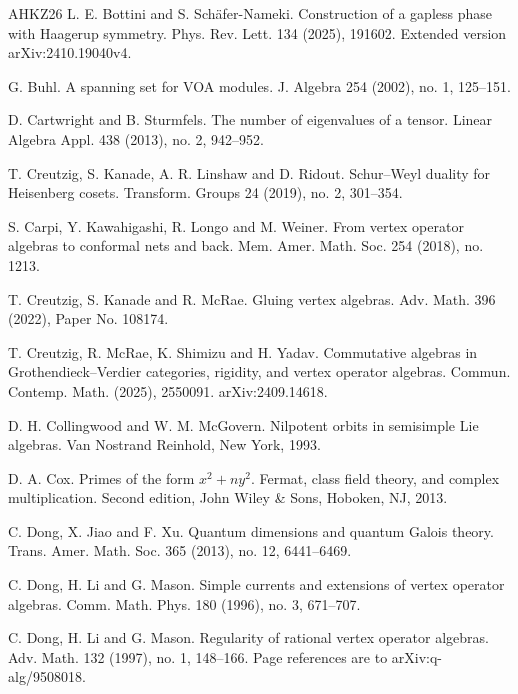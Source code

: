 \documentclass[leqno]{article}
\numberwithin{equation}{section}
\begin{document}
\begin{thebibliography}{AHKZ26}
L. E. Bottini and S. Schäfer-Nameki.
\newblock Construction of a gapless phase with Haagerup symmetry.
\newblock Phys. Rev. Lett. 134 (2025), 191602. Extended version arXiv:2410.19040v4.

G. Buhl.
\newblock A spanning set for VOA modules.
\newblock J. Algebra 254 (2002), no. 1, 125--151.

D. Cartwright and B. Sturmfels.
\newblock The number of eigenvalues of a tensor.
\newblock Linear Algebra Appl. 438 (2013), no. 2, 942--952.

T. Creutzig, S. Kanade, A. R. Linshaw and D. Ridout.
\newblock Schur--Weyl duality for Heisenberg cosets.
\newblock Transform. Groups 24 (2019), no. 2, 301--354.

S. Carpi, Y. Kawahigashi, R. Longo and M. Weiner.
\newblock From vertex operator algebras to conformal nets and back.
\newblock Mem. Amer. Math. Soc. 254 (2018), no. 1213.

T. Creutzig, S. Kanade and R. McRae.
\newblock Gluing vertex algebras.
\newblock Adv. Math. 396 (2022), Paper No. 108174.

T. Creutzig, R. McRae, K. Shimizu and H. Yadav.
\newblock Commutative algebras in Grothendieck--Verdier categories, rigidity, and vertex operator algebras.
\newblock Commun. Contemp. Math. (2025), 2550091. arXiv:2409.14618.

D. H. Collingwood and W. M. McGovern.
\newblock Nilpotent orbits in semisimple Lie algebras.
\newblock Van Nostrand Reinhold, New York, 1993.

D. A. Cox.
\newblock Primes of the form $x^2+ny^2$. Fermat, class field theory, and complex multiplication.
\newblock Second edition, John Wiley \& Sons, Hoboken, NJ, 2013.

C. Dong, X. Jiao and F. Xu.
\newblock Quantum dimensions and quantum Galois theory.
\newblock Trans. Amer. Math. Soc. 365 (2013), no. 12, 6441--6469.

C. Dong, H. Li and G. Mason.
\newblock Simple currents and extensions of vertex operator algebras.
\newblock Comm. Math. Phys. 180 (1996), no. 3, 671--707.

C. Dong, H. Li and G. Mason.
\newblock Regularity of rational vertex operator algebras.
\newblock Adv. Math. 132 (1997), no. 1, 148--166. Page references are to arXiv:q-alg/9508018.


\end{thebibliography}
\end{document}

